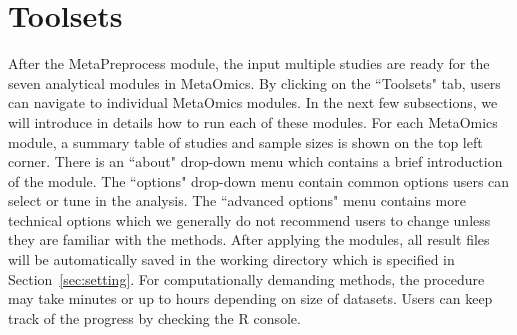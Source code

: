 \section{Toolsets}

After the MetaPreprocess module, 
the input multiple studies are ready for the seven analytical modules in MetaOmics.
By clicking on the ``Toolsets" tab, users can navigate to individual MetaOmics modules.
In the next few subsections, 
we will introduce in details how to run each of these modules.
For each MetaOmics module, 
a summary table of studies and sample sizes is shown on the top left corner. 
There is an ``about" drop-down menu which contains a brief introduction  of the module.
The ``options" drop-down menu contain common options users can select or tune in the analysis.
The ``advanced options" menu contains more technical options which we generally do not recommend users to change unless they are familiar with the methods.
After applying the modules, 
all result files will be automatically saved in the working directory which is specified in Section~\ref{sec:setting}.
For computationally demanding methods, the procedure may take minutes or up to hours depending on size of datasets.
Users can keep track of the progress by checking the R console.






